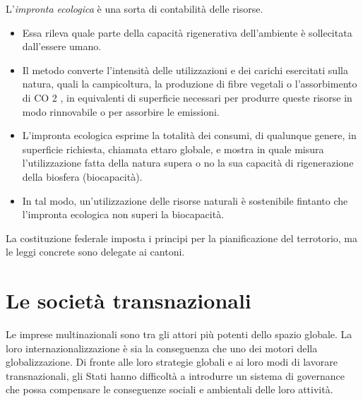 \documentclass[a4paper]{article}
\begin{document}
L'\textit{impronta ecologica} è una sorta di contabilità delle risorse.
\begin{itemize}
    \item Essa rileva quale parte della capacità rigenerativa
        dell'ambiente è sollecitata dall'essere umano.
    \item Il metodo converte l'intensità delle utilizzazioni e dei
        carichi esercitati sulla natura, quali la campicoltura, la
        produzione di fibre vegetali o l'assorbimento di CO 2 , in
        equivalenti di superficie necessari per produrre queste
        risorse in modo rinnovabile o per assorbire le emissioni.
    \item L'impronta ecologica esprime la totalità dei consumi, di qualunque
        genere, in superficie richiesta, chiamata ettaro globale, e mostra
        in quale misura l'utilizzazione fatta della natura supera o no la sua
        capacità di rigenerazione della biosfera (biocapacità). 
    \item In tal modo, un'utilizzazione delle risorse naturali è sostenibile
        fintanto che l'impronta ecologica non superi la biocapacità.
\end{itemize}


La costituzione federale imposta i principi per la pianificazione del terrotorio,
ma le leggi concrete sono delegate ai cantoni.

\pagebreak

\section{Le società transnazionali}

Le imprese multinazionali sono tra gli attori più potenti dello spazio globale. La loro
internazionalizzazione è sia la conseguenza che uno dei motori della globalizzazione. Di fronte alle loro
strategie globali e ai loro modi di lavorare transnazionali, gli Stati hanno difficoltà a introdurre un
sistema di governance che possa compensare le conseguenze sociali e ambientali delle loro attività.

\end{document}
